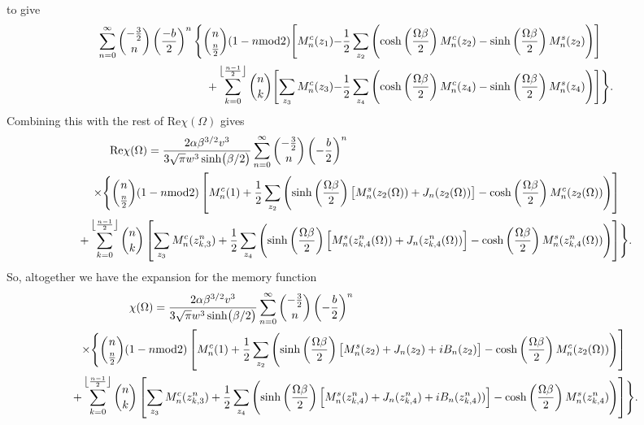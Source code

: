 to give
\begin{equation}
    \begin{aligned}
        \sum_{n = 0}^\infty \binom{-\frac{3}{2}}{n} \left(\frac{-b}{2}\right)^n \Bigg\{ \binom{n}{\frac{n}{2}}(1 - n \textrm{mod} 2) \Biggl[ M^{c}_n(z_1) - &\frac{1}{2} \sum_{z_2} \left( \cosh\left(\frac{\Omega\beta}{2}\right) M^{c}_n(z_2) - \sinh\left(\frac{\Omega\beta}{2}\right) M^{s}_n(z_2) \right) \Biggr] \\
        + \sum_{k=0}^{\floor*{\frac{n-1}{2}}} \binom{n}{k} \Biggl[ \sum_{z_3} M^{c}_n(z_3) - &\frac{1}{2} \sum_{z_4} \left( \cosh\left(\frac{\Omega\beta}{2}\right) M^{c}_n(z_4) - \sinh\left(\frac{\Omega\beta}{2}\right) M^{s}_n(z_4) \right) \Biggr] \Bigg\}.
    \end{aligned}
\end{equation}
Combining this with the rest of $\textrm{Re}\chi(\Omega)$ gives
\begin{equation}
    \begin{aligned}
        \textrm{Re}\chi(\Omega) = \frac{2\alpha \beta^{3/2} v^3}{3\sqrt{\pi} w^3 \sinh(\beta/2)} \sum_{n=0}^\infty \binom{-\frac{3}{2}}{n} \left(-\frac{b}{2}\right)^n \qquad\qquad\qquad\qquad\qquad\qquad\qquad\qquad\qquad\qquad\qquad\qquad& \\ 
        \times \Bigg\{ \binom{n}{\frac{n}{2}} (1 - n\textrm{mod}2) \left[ M^{c}_n(1) + \frac{1}{2} \sum_{z_2} \left( \sinh\left(\frac{\Omega\beta}{2}\right) \left[ M^{s}_n(z_2(\Omega)) + J_n(z_2(\Omega)) \right] - \cosh\left(\frac{\Omega\beta}{2}\right) M^{c}_n(z_2(\Omega)) \right) \right]&\\
        + \sum_{k = 0}^{\floor*{\frac{n-1}{2}}} \binom{n}{k} \left[ \sum_{z_3} M^{c}_n(z_{k,3}^n) + \frac{1}{2} \sum_{z_4} \left( \sinh\left(\frac{\Omega\beta}{2}\right) \left[ M^{s}_n(z_{k,4}^n(\Omega)) + J_n(z_{k,4}^n(\Omega)) \right] - \cosh\left(\frac{\Omega\beta}{2}\right) M^{s}_n(z^n_{k,4}(\Omega)) \right) \right]&\Bigg\}.
    \end{aligned}
\end{equation}
So, altogether we have the expansion for the memory function
\begin{equation}
    \begin{aligned}
        \chi(\Omega) = \frac{2\alpha \beta^{3/2} v^3}{3\sqrt{\pi} w^3 \sinh(\beta/2)} \sum_{n=0}^\infty \binom{-\frac{3}{2}}{n} \left(-\frac{b}{2}\right)^n \qquad\qquad\qquad\qquad\qquad\qquad\qquad\qquad\qquad\qquad\qquad\qquad& \\ 
        \times \Bigg\{ \binom{n}{\frac{n}{2}} (1 - n\textrm{mod}2) \left[ M^{c}_n(1) + \frac{1}{2} \sum_{z_2} \left( \sinh\left(\frac{\Omega\beta}{2}\right) \left[ M^{s}_n(z_2) + J_n(z_2) + iB_n(z_2) \right] - \cosh\left(\frac{\Omega\beta}{2}\right) M^{c}_n(z_2(\Omega)) \right) \right]&\\
        + \sum_{k = 0}^{\floor*{\frac{n-1}{2}}} \binom{n}{k} \left[ \sum_{z_3} M^{c}_n(z_{k,3}^n) + \frac{1}{2} \sum_{z_4} \left( \sinh\left(\frac{\Omega\beta}{2}\right) \left[ M^{s}_n(z_{k,4}^n) + J_n(z_{k,4}^n) + iB_n(z_{k,4}^n)) \right] - \cosh\left(\frac{\Omega\beta}{2}\right) M^{s}_n(z^n_{k,4}) \right) \right]&\Bigg\}.
    \end{aligned}
\end{equation}